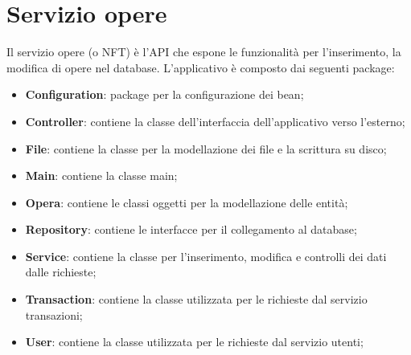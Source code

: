 \section{Servizio opere}
Il servizio opere (o NFT) è l'API che espone le funzionalità per l'inserimento, la modifica di opere nel database.
L'applicativo è composto dai seguenti package:
\begin{itemize}
	\item \textbf{Configuration}: package per la configurazione dei bean;
	\item \textbf{Controller}: contiene la classe dell'interfaccia dell'applicativo verso l'esterno;
	\item \textbf{File}: contiene la classe per la modellazione dei file e la scrittura su disco;
	\item \textbf{Main}: contiene la classe main;
	\item \textbf{Opera}: contiene le classi oggetti per la modellazione delle entità;
	\item \textbf{Repository}: contiene le interfacce per il collegamento al database;
	\item \textbf{Service}: contiene la classe per l'inserimento, modifica e controlli dei dati dalle richieste;
	\item \textbf{Transaction}: contiene la classe utilizzata per le richieste dal servizio transazioni;
	\item \textbf{User}: contiene la classe utilizzata per le richieste dal servizio utenti;
\end{itemize} 

